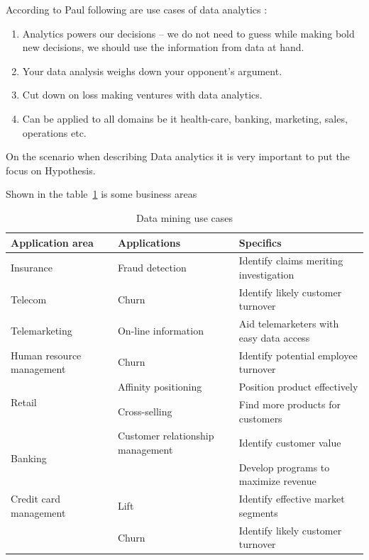 According to Paul following are use cases  of data analytics :
\begin{enumerate}
	\item Analytics powers our decisions – we do not need to guess while making bold new decisions, we should use the information from data at hand.
	\item Your data analysis weighs down your opponent's argument.
	\item Cut down on loss making ventures with data analytics.
	\item Can be applied to all domains be it health-care, banking, marketing, sales, operations etc.
\end{enumerate}

On the scenario when describing Data analytics it is very important to put the focus on Hypothesis.

Shown in the table~\ref{tableDMusecase} is some business areas 


\begin{table}[H]
	\centering
	\begin{tabular}{|p{4cm}|p{4cm}|l|}
		\hline
		\textbf{Application area} & \textbf{Applications} & \textbf{Specifics}\\
		\hline
		Insurance & Fraud detection & Identify claims meriting investigation\\
		\hline
		Telecom & Churn & Identify likely customer turnover\\
		\hline
		Telemarketing & On-line information & Aid telemarketers with easy data access\\
		\hline
		Human resource management & Churn & Identify potential employee turnover\\
		\hline
		\multirow{2}{4em}{Retail}  & Affinity positioning & Position product effectively\\
		& Cross-selling & Find more products for customers\\
		\hline
		\multirow{2}{4em}{Banking} & Customer relationship management & Identify customer value\\
		&& Develop programs to maximize revenue\\
		\hline
		Credit card management & Lift & Identify effective market segments\\
		& Churn & Identify likely customer turnover\\
		\hline
	\end{tabular}
	\caption{Data mining use cases}
	\label{tableDMusecase}
\end{table}
	
